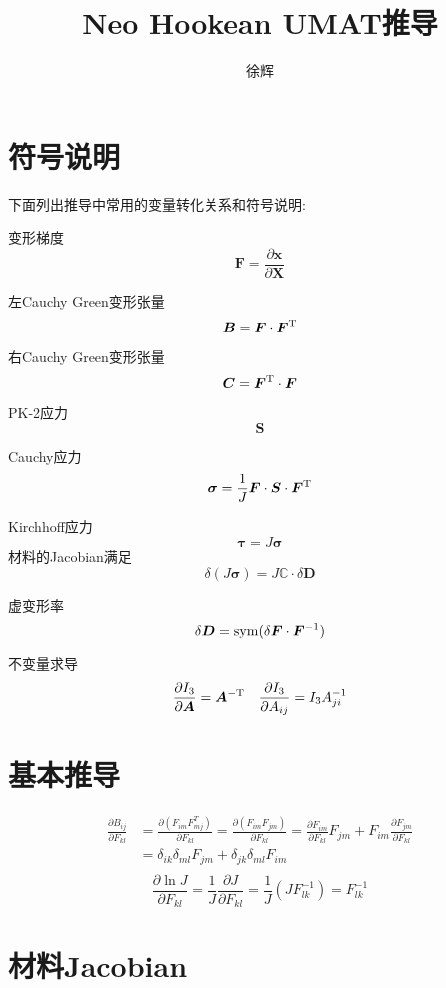 \documentclass{article}
\title{Neo Hookean UMAT推导}
\author{徐辉}
\begin{document}
\maketitle
\section{符号说明}
下面列出推导中常用的变量转化关系和符号说明:

变形梯度
$$\bm{F}=\frac{\partial \bm{x}}{ \partial \bm{X}}$$

左Cauchy Green变形张量
$$\bm{B}= \bm{F} \cdot \bm{F}^{\rm T}$$

右Cauchy Green变形张量
$$\bm{C}=\bm{F}^{\rm T}\cdot \bm{F}$$

PK-2应力
$$\bm{S}$$

Cauchy应力
$$\bm{\sigma}=\frac{1}{J}\bm{F}\cdot \bm{S} \cdot \bm{F}^{\rm T}$$

Kirchhoff应力
$$\bm{\tau}=J\bm{\sigma}$$
材料的Jacobian满足
$$\delta(J\bm{\sigma})=J\mathbb{C}\cdot \delta \bm{D}$$

虚变形率
$$\delta \bm{D}={\rm sym}(\delta \bm{F}\cdot \bm{F}^{-1})$$

不变量求导
$$\frac{\partial I_3}{\partial \bm{A}}=\bm{A}^{\rm -T}\quad \frac{\partial I_3}{\partial A_{ij}}=I_3 A_{ji}^{-1}$$

\section{基本推导}
\begin{equation*}
    \begin{aligned}
        \frac{\partial B_{ij}}{\partial F_{kl}} & =\frac{\partial (F_{im}F_{mj}^T)}{\partial F_{kl}}=\frac{\partial (F_{im}F_{jm})}{\partial F_{kl}}
        =\frac{\partial F_{im}}{\partial F_{kl}}F_{jm} +F_{im} \frac{\partial F_{jm}}{\partial F_{kl}}                                               \\
                                                & =\delta_{ik}\delta_{ml}F_{jm}+\delta_{jk}\delta_{ml}F_{im}                                         \\
    \end{aligned}
\end{equation*}
$$\frac{\partial \ln J}{\partial F_{kl}}=\frac{1}{J}\frac{\partial J}{\partial F_{kl}}=\frac{1}{J}(JF_{lk}^{-1})=F_{lk}^{-1}$$
\section{材料Jacobian}
\end{document}
